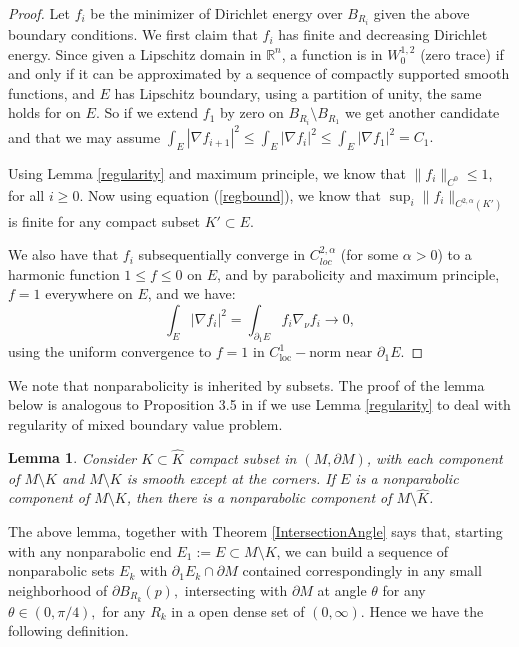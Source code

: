 \documentclass[12pt]{amsart}
\newcommand{\R}{\mathbb R}
\newcommand{\loc}{\text{loc}}
\newcommand{\p}{\partial}
\newtheorem{lemma}[theorem]{Lemma}
\numberwithin{equation}{section}
\begin{document}
	\begin{proof}
		Let $f_i$ be the minimizer of Dirichlet energy over $B_{R_i}$ given the above boundary conditions.
		We first claim that $f_i$ has finite and decreasing Dirichlet energy. Since given a Lipschitz domain in $\R^n$,  a function is in $W_0^{1,2}$ (zero trace) if and only if it can be approximated by a sequence of compactly supported smooth functions, and $E$ has Lipschitz boundary, using a partition of unity, the same  holds for on $E$. So if we extend $f_1$ by zero on $B_{R_i}\setminus B_{R_1}$ we get another candidate and that we may assume $\int_E |\nabla f_{i+1}|^2 \leq \int_E |\nabla f_i|^2\leq  \int_E |\nabla f_1|^2=C_1.$

		Using Lemma \ref{regularity} and maximum principle, we know that $\|f_i\|_{C^0}\leq 1$, for all $i\geq 0$. Now using equation (\ref{regbound}), we know that $ \sup_i  \|f_i\|_{C^{2,\alpha}(K')}$ is finite for any compact subset $K' \subset E$. 
		
		We also have that $f_i$ subsequentially converge in $C^{2,\alpha}_{loc}$ (for some $\alpha >0$) to a harmonic function $1\leq f \leq 0$ on $E$, and by parabolicity and maximum principle, $f=1$ everywhere on $E$, and we have:
		\begin{equation*}
			\int_E |\nabla f_i|^2 = \int_{\partial_1 E} f_i \nabla_{\nu} f_i \rightarrow 0,
		\end{equation*}
		using the uniform convergence to $f=1$ in $C^1_{\loc}-$norm near $\p_1 E$.
	\end{proof}


	We note that nonparabolicity is inherited by subsets. The proof of the lemma below is analogous to Proposition 3.5 in \cite{ChodoLiStryk2022-CompleteStableMinimal}  if we use Lemma \ref{regularity} to deal with regularity of mixed boundary value problem.
	\begin{lemma}
		Consider $K\subset \hat{K}$ compact subset in $(M,\p M)$, with each component of $M \setminus \hat{K}$ and $M \setminus K $ is smooth except at the corners. If $E$ is a nonparabolic component of $M \setminus K$, then there is a nonparabolic component of $M \setminus \hat{K}$.
	\end{lemma}


	The above lemma, together with {Theorem \ref{IntersectionAngle}}  says that, starting with any nonparabolic end $E_1:=E \subset M\setminus K$, we can build a sequence of nonparabolic sets $E_k$ with $\partial_1 E_k\cap \partial M$ contained correspondingly in any small neighborhood of $\partial B_{R_k}(p),$  intersecting with $\partial M$ at angle $\theta$ for any $\theta \in (0,\pi/4),$ for any $R_k$ in a open dense set of $(0,\infty).$ Hence we have the following definition.
	
\end{document}
